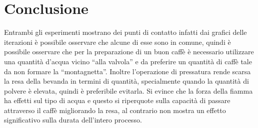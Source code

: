 \chapter{Conclusione}
Entrambi gli esperimenti mostrano dei punti di contatto infatti dai grafici delle iterazioni è possibile osservare che alcune di esse sono in comune, quindi è possibile osservare che per la preparazione di un buon caffè è necessario utilizzare una quantità d'acqua vicino “alla valvola” e da preferire un quantità di caffè tale da non formare la “montagnetta”. Inoltre l'operazione di pressatura rende scarsa la resa della bevanda in termini di quantità, specialmente quando la quantità di polvere è elevata, quindi è preferibile evitarla.
 Si evince che la forza della fiamma ha effetti sul tipo di acqua e questo si riperquote sulla capacità di passare attraverso il caffè migliorando la resa, al contrario non mostra un effetto significativo sulla durata dell'intero processo.
